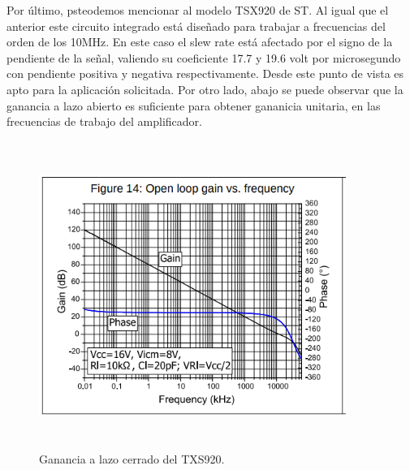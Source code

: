 Por último, psteodemos mencionar al modelo TSX920 de ST. Al igual que el anterior este circuito integrado está dise\~nado para trabajar a frecuencias del orden de los 10MHz. En este caso el slew rate está afectado por el signo de la pendiente de la se\~nal, valiendo su coeficiente 17.7 y 19.6 volt por microsegundo con pendiente positiva y negativa respectivamente. Desde este punto de vista es apto para la aplicación solicitada.  Por otro lado, abajo se puede observar que la ganancia a lazo abierto es suficiente para obtener gananicia unitaria, en las frecuencias de trabajo del amplificador.

\begin{figure}[H] %
	\centering
	\includegraphics[width=10cm,height=10cm,keepaspectratio]{../EJ1/00GRAFICOS/imagenes/EJ1_avol_tsx920.png}
	\caption{Ganancia a lazo cerrado del TXS920.}
	\label{i2}
\end{figure}